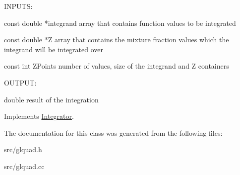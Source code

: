 \begin{DoxyVerb}
  INPUTS:

  const double *integrand            array that contains function values to be integrated

  const double *Z                    array that contains the mixture fraction values which the integrand will be integrated over

  const int ZPoints                  number of values, size of the integrand and Z containers
  
  OUTPUT:

  double                             result of the integration

  \end{DoxyVerb}
 

Implements \hyperlink{classIntegrator_a89fbef2f7923ce4e2c979b2ff1d1f4ac}{Integrator}.

The documentation for this class was generated from the following files:\begin{DoxyCompactItemize}
\item 
src/glquad.h\item 
src/glquad.cc\end{DoxyCompactItemize}
